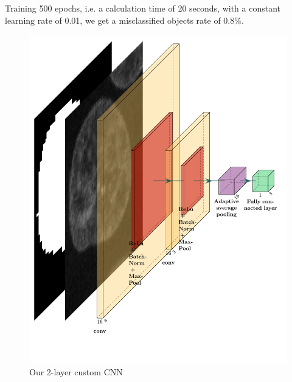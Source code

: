 \documentclass{article}
\begin{document}
Training 500 epochs, i.e. a calculation time of 20 seconds, with a constant learning rate of 0.01, we get a misclassified objects rate of 0.8\%.


\begin{figure}[h!]{}
 \centering
 \includegraphics[scale=0.35]{Figures/myfirstcnn.pdf}
  \caption{Our 2-layer custom CNN}
  \label{CNN2D}

\end{figure}
\end{document}
